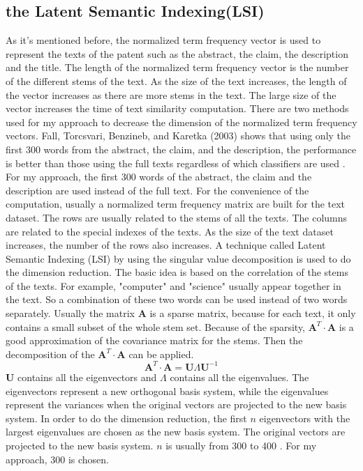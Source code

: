 \subsection{the Latent Semantic Indexing(LSI)}
As it's mentioned before, the normalized term frequency vector is used to represent the texts of the patent such as the abstract, the claim, the description and the title. The length of the normalized term frequency vector is the number of the different stems of the text. As the size of the text increases, the length of the vector increases as there are more stems in the text. The large size of the vector increases the time of text similarity computation. There are two methods used for my approach to decrease the dimension of  the normalized term frequency vectors. Fall, Torcsvari, Benzineb, and Karetka (2003) shows that  using only the first 300
words from the abstract, the claim, and the description, the performance is better than those using the full texts regardless of which classifiers are used \cite{tseng2007text}. For my approach, the first 300 words of the abstract, the claim and the description are used instead of the full text. For the convenience of the computation, usually a normalized term frequency matrix are built for the text dataset. The rows are usually related to the stems of all the texts. The columns are related to the special indexes of the texts. As the size of the text dataset increases, the number of the rows  also increases.  A technique called Latent Semantic Indexing (LSI) by using the singular value decomposition is used to do the dimension reduction. The basic idea is based on the correlation of the stems of the texts. For example, "computer" and "science" usually appear together in the text. So a combination of these two words can be used instead of two words separately. Usually the matrix $\textbf{A}$ is a sparse matrix, because for each text, it only contains a small subset of the whole stem set. Because of the sparsity, $\textbf{A}^T \cdot \textbf{A}$ is a good approximation of the covariance matrix for the stems. Then the decomposition of the $\textbf{A}^T \cdot \textbf{A}$ can be applied.
\begin{equation}
\textbf{A}^T \cdot \textbf{A} = \textbf{U}  \Lambda \textbf{U}^{-1}
\end{equation}
$\textbf{U}$ contains all the eigenvectors and $\Lambda$ contains all the eigenvalues. The eigenvectors represent a new orthogonal basis system, while the eigenvalues represent the variances when the original vectors are projected to the new basis system. In order to do the dimension reduction, the first $n$ eigenvectors with the largest eigenvalues are chosen as the new basis system. The original vectors are projected to the new basis system. $n$ is usually from 300 to 400 \cite{ASTCA}. For my approach, 300 is chosen. 

